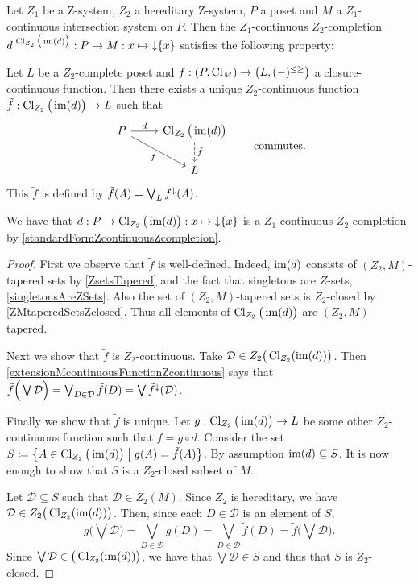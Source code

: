 \begin{proposition} \label{ZcontinuousExtension}
Let $Z_1$ be a $\mathrm{Z}$-system, $Z_2$ a hereditary $\mathrm{Z}$-system, $P$ a poset and $M$ a $Z_1$-continuous intersection system on $P$. Then the $Z_1$-continuous $Z_2$-completion $d|^{\operatorname{Cl}_{Z_2}\big(\operatorname{im}(d)\big)}: P \to M: x\mapsto \operatorname{\downarrow}\{x\}$ satisfies the following property:

Let $L$ be a $Z_2$-complete poset and $f: \sSet{P, \Closure_M}\to \sSet{L, (-)^{\leq\geq}}$ a closure-continuous function. Then there exists a unique $Z_2$-continuous function $\tilde{f}: \operatorname{Cl}_{Z_2}\big(\operatorname{im}(d)\big) \to L$ such that
\[ \begin{tikzcd}
P \ar[r, "d"] \ar[dr, swap, "f"] & \Closure_{Z_2}\big(\im(d)\big) \ar[d, dashed, "{\tilde{f}}"] \\ {} & L
\end{tikzcd} \qquad \text{commutes.} \]
This $\tilde{f}$ is defined by $\tilde{f}(A) = \bigvee_L f^\downarrow(A)$.
\end{proposition}
We have that $d: P \to \operatorname{Cl}_{Z_2}\big(\operatorname{im}(d)\big): x\mapsto \operatorname{\downarrow}\{x\}$ is a $Z_1$-continuous $Z_2$-completion by \ref{standardFormZcontinuousZcompletion}.
\begin{proof}
First we observe that $\tilde{f}$ is well-defined. Indeed, $\operatorname{im}(d)$ consists of $(Z_2, M)$-tapered sets by \ref{ZsetsTapered} and the fact that singletons are $Z$-sets, \ref{singletonsAreZSets}. Also the set of $(Z_2, M)$-tapered sets is $Z_2$-closed by \ref{ZMtaperedSetsZclosed}. Thus all elements of $\operatorname{Cl}_{Z_2}\big(\operatorname{im}(d)\big)$ are $(Z_2, M)$-tapered.

Next we show that $\tilde{f}$ is $Z_2$-continuous. Take $\mathcal{D} \in Z_2\big(\operatorname{Cl}_{Z_2}(\operatorname{im}(d))\big)$. Then \ref{extensionMcontinuousFunctionZcontinuous} says that $\tilde{f}\Big(\bigvee \mathcal{D}\Big) = \bigvee_{D\in \mathcal{D}}\tilde{f}(D) = \bigvee\tilde{f}^\downarrow(\mathcal{D})$.

Finally we show that $\tilde{f}$ is unique. Let $g: \operatorname{Cl}_{Z_2}\big(\operatorname{im}(d)\big) \to L$ be some other $Z_2$-continuous function such that $f = g\circ d$. Consider the set $S\defeq\setbuilder{A\in \Closure_{Z_2}\big(\im(d)\big)}{g(A) = \tilde{f}(A)}$. By assumption $\operatorname{im}(d) \subseteq S$. It is now enough to show that $S$ is a $Z_2$-closed subset of $M$.

Let $\mathcal{D} \subseteq S$ such that $\mathcal{D} \in Z_2(M)$. Since $Z_2$ is hereditary, we have $\mathcal{D} \in Z_2\big(\operatorname{Cl}_{Z_2}(\operatorname{im}(d))\big)$. Then, since each $D\in\mathcal{D}$ is an element of $S$,
\[ g\Big(\bigvee \mathcal{D}\Big) = \bigvee_{D\in \mathcal{D}}g(D) = \bigvee_{D\in \mathcal{D}}\tilde{f}(D) = \tilde{f}\Big(\bigvee \mathcal{D}\Big). \]
Since $\bigvee \mathcal{D}\in \big(\operatorname{Cl}_{Z_2}(\operatorname{im}(d))\big)$, we have that $\bigvee \mathcal{D} \in S$ and thus that $S$ is $Z_2$-closed.
\end{proof}
